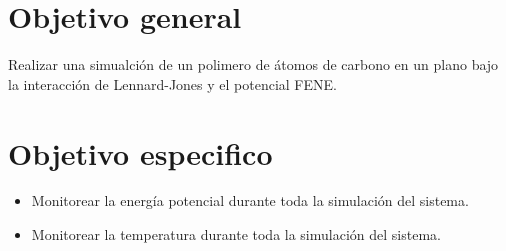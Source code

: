 \section{Objetivo general}
Realizar una simualción de un polimero de átomos de carbono 
en un plano bajo la interacción de Lennard-Jones y el potencial 
FENE.
\section{Objetivo especifico}
\begin{itemize}
    \item Monitorear la energía potencial durante toda la simulación del sistema.
    \item Monitorear la temperatura durante toda la simulación del sistema.
\end{itemize}